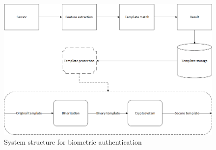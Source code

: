
\begin{figure}[htbp!] 
\centering    
\includegraphics[width=1.0\textwidth]{Chapter2/Figs/Figure2-1.png}
\caption[System structure for biometric authentication]{System structure for biometric authentication}
\label{fig:System structure for biometric authentication}
\end{figure}

